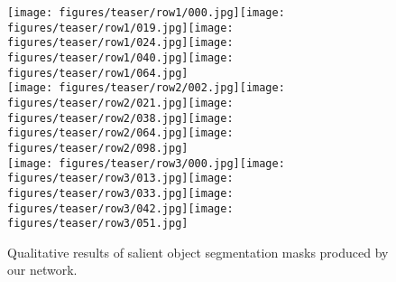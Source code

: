 \documentclass{bmvc2k_arxiv}
\begin{document}
\begin{figure}[t]
\centering
  \texttt{[image: figures/teaser/row1/000.jpg]}\hspace{1px}\texttt{[image: figures/teaser/row1/019.jpg]}\hspace{1px}\texttt{[image: figures/teaser/row1/024.jpg]}\hspace{1px}\texttt{[image: figures/teaser/row1/040.jpg]}\hspace{1px}\texttt{[image: figures/teaser/row1/064.jpg]}\\
  \texttt{[image: figures/teaser/row2/002.jpg]}\hspace{1px}\texttt{[image: figures/teaser/row2/021.jpg]}\hspace{1px}\texttt{[image: figures/teaser/row2/038.jpg]}\hspace{1px}\texttt{[image: figures/teaser/row2/064.jpg]}\hspace{1px}\texttt{[image: figures/teaser/row2/098.jpg]}\\
  \texttt{[image: figures/teaser/row3/000.jpg]}\hspace{1px}\texttt{[image: figures/teaser/row3/013.jpg]}\hspace{1px}\texttt{[image: figures/teaser/row3/033.jpg]}\hspace{1px}\texttt{[image: figures/teaser/row3/042.jpg]}\hspace{1px}\texttt{[image: figures/teaser/row3/051.jpg]}\\
  
\raggedleft
{}
\vspace{-2px}
  \caption{Qualitative results of salient object segmentation masks produced by our network.}
  \label{fig:teaser}
\end{figure}
\end{document}
